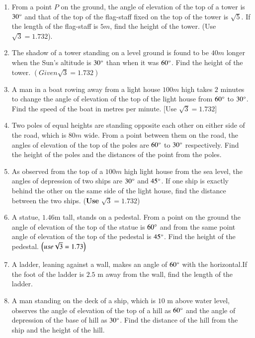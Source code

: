 \begin{enumerate}
\hfill{}\item From a point $P$ on the ground, the angle of elevation of the top of a tower is $30\degree$ and that of the top of the flag-staff fixed on the top of the tower is $\sqrt{5}$. If the length of the flag-staff is $5 m$, find the height of the tower. (Use $\sqrt{3}= 1.732$).


\hfill{}\item The shadow of a tower standing on a level ground is found to be $40 m$ longer when the Sun's altitude is $30\degree$ than when it was $60\degree$. Find the height of the tower. $(Given \sqrt{3} = 1.732)$

\hfill{}\item A man in a boat rowing away from a light house $100m$  high takes $2$ minutes to change the angle of elevation of the top of the light house from $60\degree$ to $30\degree$. Find the speed of the boat in metres per minute. [Use $\sqrt{3}=1.732$]
\hfill{}\item Two poles of equal heights are standing opposite each other on either side of the road, which is $80 m$  wide. From a point between them on the road, the angles of elevation of the top of the poles are $60\degree$ to $30\degree$ respectively. Find the height of the poles and the distances of the point from the poles.
\hfill{}
		\item As observed from the top of a $100 m$ high light house from the sea level, the angles of depression of two ships are $30\degree$ and $45\degree$. If one ship is exactly behind the other on the same side of the light house, find the distance between the two ships. ({\textbf{Use}} $\sqrt3 = 1.732$)
\hfill{}
\item A statue, $1.46$m tall, stands on a pedestal. From a point on the ground the angle of elevation of the top of the statue is $60\degree{}$ and from the same point angle of elevation of the top of the pedestal is $45\degree{}$. Find the height of the pedestal. $\left(use \sqrt{3}=1.73\right)$
\hfill{}
\item A ladder, leaning against a wall, makes an angle of $60 \degree$ with the horizontal.If the foot of the ladder is $2.5$ m away from the wall, find the length of the ladder.\\
\hfill{}\item  A man standing on the deck of a ship, which is $10$ m above water level, observes the angle of elevation of the top of a hill as $ 60\degree $ and the angle of depression of the base of hill as $ 30 \degree $. Find the distance of the hill from the ship and the height of the hill.\\

\end{enumerate}
